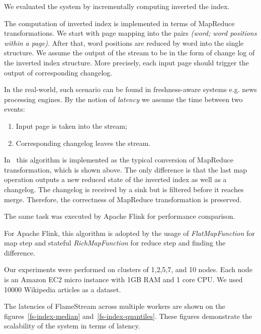 
\label{fs-experiments-section}

We evaluated the system by incrementally computing inverted the index.

The computation of inverted index is implemented in terms of MapReduce transformations. We start with page mapping into the pairs {\it (word; word positions within a page)}. After that, word positions are reduced by word into the single structure. We assume the output of the stream to be in the form of change log of the inverted index structure. More precisely, each input page should trigger the output of corresponding changelog. 

In the real-world, such scenario can be found in freshness-aware systems e.g. news processing engines. By the notion of {\it latency} we assume the time between two events: 
\begin{enumerate}
    \item Input page is taken into the stream;
    \item Corresponding changelog leaves the stream.
\end{enumerate}

In \FlameStream\ this algorithm is implemented as the typical conversion of MapReduce transformation, which is shown above. The only difference is that the last map operation outputs a new reduced state of the inverted index as well as a changelog. The changelog is received by a sink but is filtered before it reaches merge. Therefore, the correctness of MapReduce transformation is preserved.

The same task was executed by Apache Flink for performance comparison.

For Apache Flink, this algorithm is adopted by the usage of {\it FlatMapFunction} for map step and stateful {\it RichMapFunction} for reduce step and finding the difference.

Our experiments were performed on clusters of 1,2,5,7, and 10 nodes. Each node is an Amazon EC2 micro instance with 1GB RAM and 1 core CPU. We used 10000 Wikipedia articles as a dataset. 

The latencies of FlameStream across multiple workers are shown on the figures~\ref{fs-index-median} and~\ref{fs-index-quantiles}. These figures demonstrate the scalability of the system in terms of latency.

